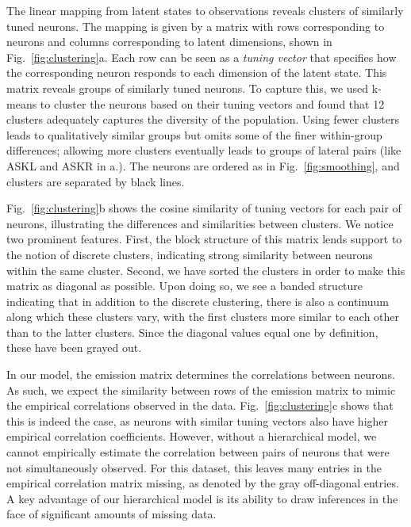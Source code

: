 \documentclass[11pt]{article}
\begin{document}
The linear mapping from latent states to observations reveals clusters
of similarly tuned neurons.  The mapping is given by a matrix with
rows corresponding to neurons and columns corresponding to latent
dimensions, shown in Fig.~\ref{fig:clustering}a.  Each row can be seen
as a \emph{tuning vector} that specifies how the corresponding neuron
responds to each dimension of the latent state.  This matrix reveals
groups of similarly tuned neurons. To capture this, we used k-means to
cluster the neurons based on their tuning vectors and found that 12
clusters adequately captures the diversity of the population.  Using
fewer clusters leads to qualitatively similar groups but omits some of
the finer within-group differences; allowing more clusters eventually
leads to groups of lateral pairs (like \textsf{ASKL} and \textsf{ASKR}
in a.).  The neurons are ordered as in Fig.~\ref{fig:smoothing}, and
clusters are separated by black lines.

Fig.~\ref{fig:clustering}b shows the cosine similarity of tuning
vectors for each pair of neurons, illustrating the differences
and similarities between clusters.  We notice two prominent
features.  First, the block structure of this
matrix lends support to the notion of discrete clusters, indicating
strong similarity between neurons within the same cluster. Second,
we have sorted the clusters in order to make this matrix as
diagonal as possible.  Upon doing so, we see a banded structure
indicating that in addition to the discrete clustering, there is
also a continuum along which these clusters vary, with the first
clusters more similar to each other than to the latter clusters.
Since the diagonal values equal one by definition, these
have been grayed out. 

In our model, the emission matrix determines the correlations between
neurons.  As such, we expect the similarity between rows of the
emission matrix to mimic the empirical correlations observed in the
data.  Fig.~\ref{fig:clustering}c shows that this is indeed the case,
as neurons with similar tuning vectors also have higher empirical
correlation coefficients.  However, without a hierarchical model, we
cannot empirically estimate the correlation between pairs of neurons
that were not simultaneously observed.  For this dataset, this leaves
many entries in the empirical correlation matrix missing, as denoted
by the gray off-diagonal entries. A key advantage of our hierarchical
model is its ability to draw inferences in the face of significant
amounts of missing data.
\end{document}
